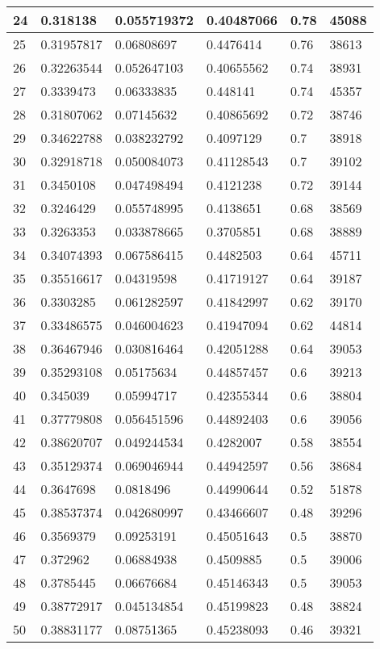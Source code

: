 \begin{longtable}{|l|l|l|l|l|l|}
24 & 0.318138 & 0.055719372 & 0.40487066 & 0.78 & 45088 \\ \hline 
25 & 0.31957817 & 0.06808697 & 0.4476414 & 0.76 & 38613 \\ \hline 
26 & 0.32263544 & 0.052647103 & 0.40655562 & 0.74 & 38931 \\ \hline 
27 & 0.3339473 & 0.06333835 & 0.448141 & 0.74 & 45357 \\ \hline 
28 & 0.31807062 & 0.07145632 & 0.40865692 & 0.72 & 38746 \\ \hline 
29 & 0.34622788 & 0.038232792 & 0.4097129 & 0.7 & 38918 \\ \hline 
30 & 0.32918718 & 0.050084073 & 0.41128543 & 0.7 & 39102 \\ \hline 
31 & 0.3450108 & 0.047498494 & 0.4121238 & 0.72 & 39144 \\ \hline 
32 & 0.3246429 & 0.055748995 & 0.4138651 & 0.68 & 38569 \\ \hline 
33 & 0.3263353 & 0.033878665 & 0.3705851 & 0.68 & 38889 \\ \hline 
34 & 0.34074393 & 0.067586415 & 0.4482503 & 0.64 & 45711 \\ \hline 
35 & 0.35516617 & 0.04319598 & 0.41719127 & 0.64 & 39187 \\ \hline 
36 & 0.3303285 & 0.061282597 & 0.41842997 & 0.62 & 39170 \\ \hline 
37 & 0.33486575 & 0.046004623 & 0.41947094 & 0.62 & 44814 \\ \hline 
38 & 0.36467946 & 0.030816464 & 0.42051288 & 0.64 & 39053 \\ \hline 
39 & 0.35293108 & 0.05175634 & 0.44857457 & 0.6 & 39213 \\ \hline 
40 & 0.345039 & 0.05994717 & 0.42355344 & 0.6 & 38804 \\ \hline 
41 & 0.37779808 & 0.056451596 & 0.44892403 & 0.6 & 39056 \\ \hline 
42 & 0.38620707 & 0.049244534 & 0.4282007 & 0.58 & 38554 \\ \hline 
43 & 0.35129374 & 0.069046944 & 0.44942597 & 0.56 & 38684 \\ \hline 
44 & 0.3647698 & 0.0818496 & 0.44990644 & 0.52 & 51878 \\ \hline 
45 & 0.38537374 & 0.042680997 & 0.43466607 & 0.48 & 39296 \\ \hline 
46 & 0.3569379 & 0.09253191 & 0.45051643 & 0.5 & 38870 \\ \hline 
47 & 0.372962 & 0.06884938 & 0.4509885 & 0.5 & 39006 \\ \hline 
48 & 0.3785445 & 0.06676684 & 0.45146343 & 0.5 & 39053 \\ \hline 
49 & 0.38772917 & 0.045134854 & 0.45199823 & 0.48 & 38824 \\ \hline 
50 & 0.38831177 & 0.08751365 & 0.45238093 & 0.46 & 39321 \\ \hline 
\end{longtable}